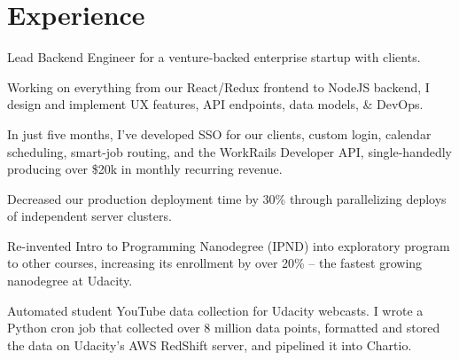 \documentclass[]{deedy-resume-openfont}
\begin{document}
\begin{minipage}[t]{0.66\textwidth}


\section{Experience}

\vspace{\topsep} %
\begin{tightemize}

\item Lead Backend Engineer for a venture-backed enterprise startup with clients.
\item Working on everything from our React/Redux frontend to NodeJS backend, I design and implement UX features, API endpoints, data models, \& DevOps.
\item In just five months, I've developed SSO for our clients, custom login, calendar scheduling, smart-job routing, and the WorkRails Developer API, single-handedly producing over \$20k in monthly recurring revenue.
\item Decreased our production deployment time by 30\% through parallelizing deploys of independent server clusters.

\end{tightemize}
\sectionsep

\begin{tightemize}

\item Re-invented Intro to Programming Nanodegree (IPND) into exploratory program to other courses, increasing its enrollment by over 20\% -- the fastest growing nanodegree at Udacity.


\item Automated student YouTube data collection for Udacity webcasts. I wrote a Python cron job that collected over 8 million data points, formatted and stored the data on Udacity's AWS RedShift server, and pipelined it into Chartio.
\end{tightemize}
\sectionsep


\end{minipage}
\end{document}

